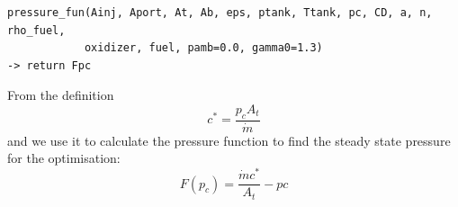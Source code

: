 \begin{verbatim}
pressure_fun(Ainj, Aport, At, Ab, eps, ptank, Ttank, pc, CD, a, n, rho_fuel, 
			oxidizer, fuel, pamb=0.0, gamma0=1.3)
-> return Fpc
\end{verbatim}
\hspace{2em} From the definition
\begin{equation}
	c^*=\frac{p_cA_t}{\dot{m}}
\end{equation}
and we use it to calculate the pressure function to find the steady state pressure
for the optimisation:
\begin{equation}
	F(p_c)=\frac{\dot{m}c^*}{A_t} - pc
	\label{eq:PressFunction}
\end{equation}







